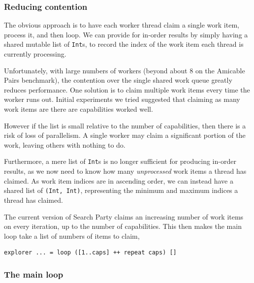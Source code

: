 \subsubsection*{Reducing contention}
\label{sec:prelims-searchparty-impl-multi-contention}

The obvious approach is to have each worker thread claim a single work
item, process it, and then loop. We can provide for in-order results
by simply having a shared mutable list of \verb|Int|s, to record the
index of the work item each thread is currently processing.

Unfortunately, with large numbers of workers (beyond about 8 on the
Amicable Pairs benchmark), the contention over the single shared work
queue greatly reduces performance. One solution is to claim multiple
work items every time the worker runs out. Initial experiments we
tried suggested that claiming as many work items are there are
capabilities worked well.

However if the list is small relative to the number of capabilities,
then there is a risk of loss of parallelism. A single worker may claim
a significant portion of the work, leaving others with nothing to do.

Furthermore, a mere list of \verb|Int|s is no longer sufficient for
producing in-order results, as we now need to know how many
\textit{unprocessed} work items a thread has claimed. As work item
indices are in ascending order, we can instead have a shared list of
\verb|(Int, Int)|, representing the minimum and maximum indices a
thread has claimed.

The current version of Search Party claims an increasing number of
work items on every iteration, up to the number of capabilities. This
then makes the main loop take a list of numbers of items to claim,

\begin{verbatim}
explorer ... = loop ([1..caps] ++ repeat caps) []
\end{verbatim}

\subsubsection*{The main loop}
\label{sec:prelims-searchparty-impl-multi-loop}

